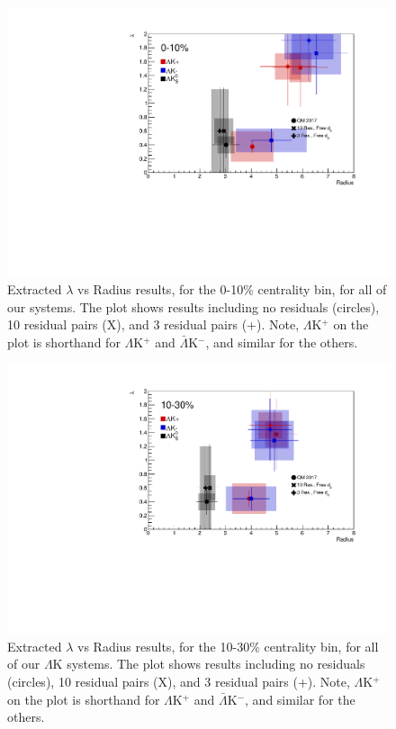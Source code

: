 \documentclass[../AnalysisNoteJBuxton.tex]{subfiles}
\begin{document}
\begin{figure}[h]
  \centering
  \includegraphics[width=\textwidth]{7_ResultsAndDiscussion/Figures/CompareAllRadiusvsLambdaAcrossAnalyses_0010_10ResAnd3Res_10and3SeparateOnly_FreeD0Only.pdf}
  \caption[$\lambda$ vs. R (0-10\% Centrality)]{Extracted $\lambda$ vs Radius results, for the 0-10\% centrality bin, for all of our \LamKchP systems.  The plot shows results including no residuals (circles), 10 residual pairs (X), and 3 residual pairs (+).  Note, $\Lambda$K$^{+}$ on the plot is shorthand for $\Lambda$K$^{+}$ and $\bar{\Lambda}$K$^{-}$, and similar for the others.}
  \label{fig:LambdavsR_0010_FreeD0Only}
\end{figure}

\begin{figure}[h]
  \centering
  \includegraphics[width=\textwidth]{7_ResultsAndDiscussion/Figures/CompareAllRadiusvsLambdaAcrossAnalyses_1030_10ResAnd3Res_10and3SeparateOnly_FreeD0Only.pdf}
  \caption[$\lambda$ vs. R (10-30\% Centrality)]{Extracted $\lambda$ vs Radius results, for the 10-30\% centrality bin, for all of our $\Lambda$K systems.  The plot shows results including no residuals (circles), 10 residual pairs (X), and 3 residual pairs (+).  Note, $\Lambda$K$^{+}$ on the plot is shorthand for $\Lambda$K$^{+}$ and $\bar{\Lambda}$K$^{-}$, and similar for the others.}
  \label{fig:LambdavsR_1030_FreeD0Only}
\end{figure}
\end{document}
